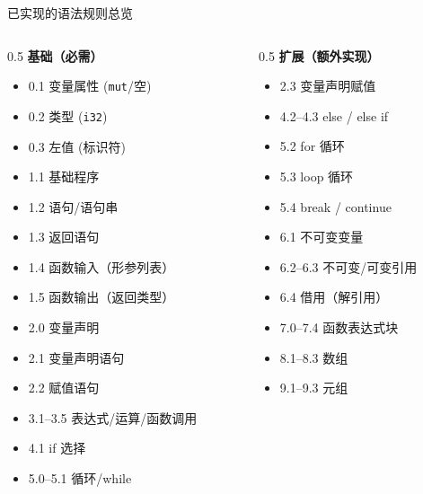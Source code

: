 \documentclass[aspectratio=169]{ctexbeamer}
\begin{document}
\begin{frame}[shrink]{已实现的语法规则总览}
    \begin{columns}[T]
    \begin{column}{0.5\textwidth}
        \textbf{基础（必需）}
        \begin{itemize}
            \footnotesize
            \item 0.1 变量属性 (\texttt{mut}/空)
            \item 0.2 类型 (\texttt{i32})
            \item 0.3 左值 (标识符)
            \item 1.1 基础程序
            \item 1.2 语句/语句串
            \item 1.3 返回语句
            \item 1.4 函数输入（形参列表）
            \item 1.5 函数输出（返回类型）
            \item 2.0 变量声明
            \item 2.1 变量声明语句
            \item 2.2 赋值语句
            \item 3.1--3.5 表达式/运算/函数调用
            \item 4.1 if 选择
            \item 5.0--5.1 循环/while
        \end{itemize}
    \end{column}
    \begin{column}{0.5\textwidth}
        \textbf{扩展（额外实现）}
        \begin{itemize}
            \footnotesize
            \item 2.3 变量声明赋值
            \item 4.2--4.3 else / else if
            \item 5.2 for 循环
            \item 5.3 loop 循环
            \item 5.4 break / continue
            \item 6.1 不可变变量
            \item 6.2--6.3 不可变/可变引用
            \item 6.4 借用（解引用）
            \item 7.0--7.4 函数表达式块
            \item 8.1--8.3 数组
            \item 9.1--9.3 元组
        \end{itemize}
    \end{column}
    \end{columns}
\end{frame}
\end{document}
